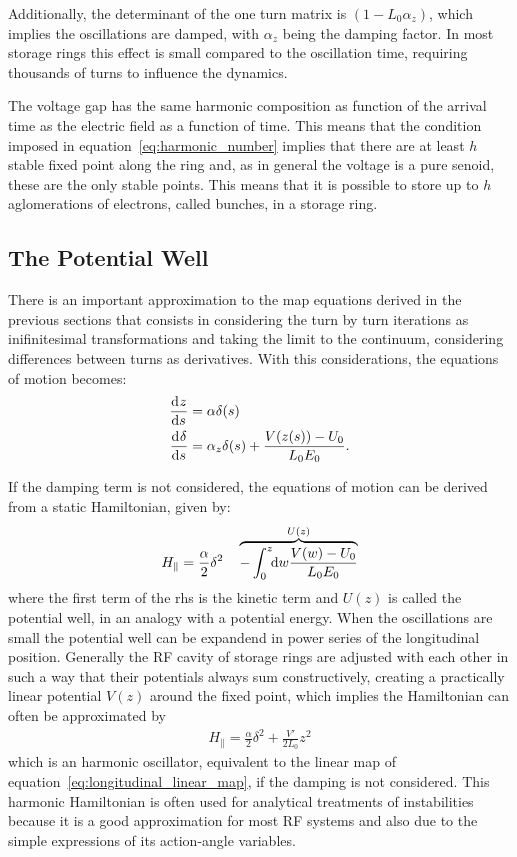 	Additionally, the determinant of the one turn matrix is $(1-L_0\alpha_z)$, which implies the oscillations are damped, with $\alpha_z$ being the damping factor. In most storage rings this effect is small compared to the oscillation time, requiring thousands of turns to influence the dynamics.

	The voltage gap has the same harmonic composition as function of the arrival time as the electric field as a function of time. This means that the condition imposed in equation~\eqref{eq:harmonic_number} implies that there are at least $h$ stable fixed point along the ring and, as in general the voltage is a pure senoid, these are the only stable points. This means that it is possible to store up to $h$ aglomerations of electrons, called bunches, in a storage ring.

\subsection{The Potential Well}\label{ssec:potential_well}

	There is an important approximation to the map equations derived in the previous sections that consists in considering the turn by turn iterations as inifinitesimal transformations and taking the limit to the continuum, considering differences between turns as derivatives. With this considerations, the equations of motion becomes:
	\begin{align}
		\dertot{z}{s} &= \alpha \delta(s) \\\nonumber
		\dertot{\delta}{s} &= \alpha_z\delta(s) + \frac{V(z(s))-U_0}{L_0E_0}.
	\end{align}

    If the damping term is not considered, the equations of motion can be derived from a static Hamiltonian, given by:
	\begin{align}\label{eq:longitudinal_hamiltonian}
		H_\parallel = \frac\alpha2\delta^2 \quad \overbrace{-
                            \defint{w}{\frac{V(w)-U_0}{L_0E_0}}{0}{z}
                        }^{U(z)}
	\end{align}
	where the first term of the \gls{rhs} is the kinetic term and $U(z)$ is called the potential well, in an analogy with a potential energy. When the oscillations are small the potential well can be expandend in power series of the longitudinal position. Generally the RF cavity of storage rings are adjusted with each other in such a way that their potentials always sum constructively, creating a practically linear potential $V(z)$ around the fixed point, which implies the Hamiltonian can often be approximated by
    \begin{align}\label{eq:quadractic_potential_well}
        H_\parallel = \frac\alpha2\delta^2 + \frac{V'}{2L_0}z^2
    \end{align}
    which is an harmonic oscillator, equivalent to the linear map of equation~\eqref{eq:longitudinal_linear_map}, if the damping is not considered. This harmonic Hamiltonian is often used for analytical treatments of instabilities because it is a good approximation for most RF systems and also due to the simple expressions of its action-angle variables.

